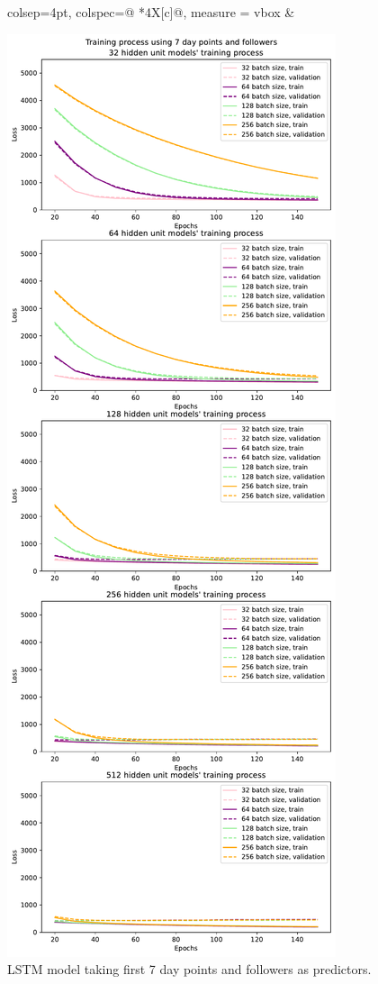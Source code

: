\documentclass{article}
\begin{document}
\begin{figure}[H]
\begin{adjustwidth}{-1.5cm}{-1.5cm}
\begin{tblr}{colsep=4pt,
             colspec={@{} *{4}{X[c]}@{}}, 
             measure = vbox}
        &
        
            \includegraphics[width=\linewidth]{figures/hyperparameters_points_followers_training.pdf}
            \caption{LSTM model taking first 7 day points and followers as predictors.}
            \label{fig:hyper3}
        

\end{tblr}
\end{adjustwidth}
\end{figure}
\end{document}
